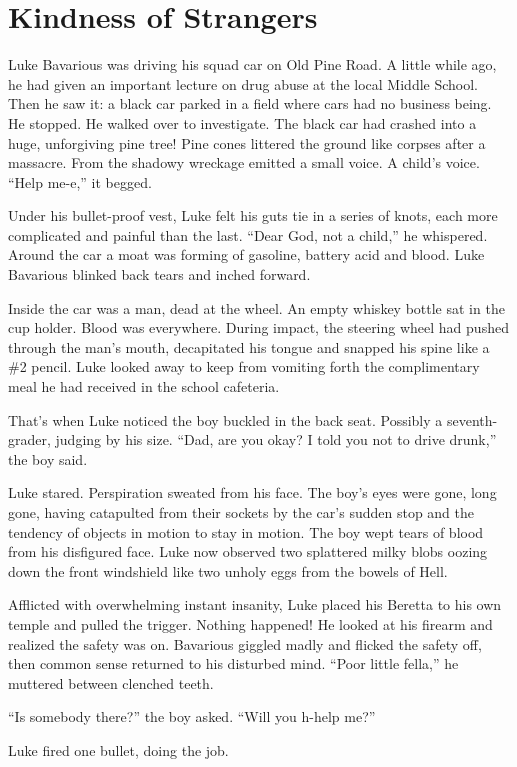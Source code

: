 \chapter{Kindness of Strangers}


Luke Bavarious was driving his squad car on Old Pine Road. A little
while ago, he had given an important lecture on drug abuse at the
local Middle School. Then he saw it: a black car parked in a field
where cars had no business being. He stopped. He walked over to
investigate. The black car had crashed into a huge, unforgiving
pine tree! Pine cones littered the ground like corpses after a
massacre. From the shadowy wreckage emitted a small voice. A
child's voice. ``Help me-e,'' it begged.



Under his bullet-proof vest, Luke felt his guts tie in a series of
knots, each more complicated and painful than the last. ``Dear
God, not a child,'' he whispered. Around the car a moat was
forming of gasoline, battery acid and blood. Luke Bavarious blinked
back tears and inched forward.



Inside the car was a man, dead at the wheel. An empty whiskey
bottle sat in the cup holder. Blood was everywhere. During impact,
the steering wheel had pushed through the man's mouth,
decapitated his tongue and snapped his spine like a \#2 pencil. Luke
looked away to keep from vomiting forth the complimentary meal he
had received in the school cafeteria.



That's when Luke noticed the boy buckled in the back seat.
Possibly a seventh-grader, judging by his size. ``Dad, are you
okay? I told you not to drive drunk,'' the boy said.



Luke stared. Perspiration sweated from his face. The boy's
eyes were gone, long gone, having catapulted from their sockets by
the car's sudden stop and the tendency of objects in motion
to stay in motion. The boy wept tears of blood from his disfigured
face. Luke now observed two splattered milky blobs oozing down the
front windshield like two unholy eggs from the bowels of
Hell.



Afflicted with overwhelming instant insanity, Luke placed his
Beretta to his own temple and pulled the trigger. Nothing happened!
He looked at his firearm and realized the safety was on. Bavarious
giggled madly and flicked the safety off, then common sense
returned to his disturbed mind. ``Poor little fella,'' he
muttered between clenched teeth.



``Is somebody there?'' the boy asked. ``Will you
h-help me?''



Luke fired one bullet, doing the job. 

 






